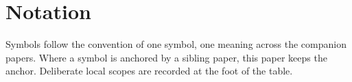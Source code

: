 \documentclass[11pt,a4paper]{article}
\theoremstyle{definition}
\theoremstyle{plain}
\theoremstyle{remark}
\begin{document}
\appendix
{}
\titlespacing*{\section}{0pt}{18pt}{8pt}

\section{Notation}\label{app:glossary}

Symbols follow the convention of one symbol, one meaning across the companion papers. Where a symbol is anchored by a sibling paper, this paper keeps the anchor. 
Deliberate local scopes are recorded at the foot of the table.
\end{document}
